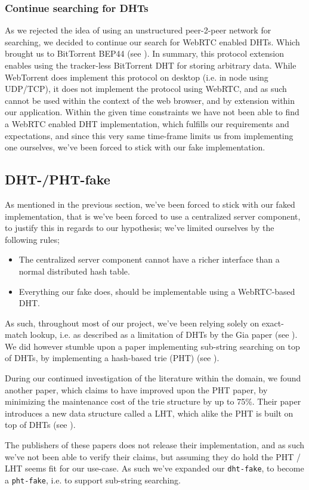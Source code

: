 \subsubsection{Continue searching for \acs{DHT}s}
As we rejected the idea of using an unstructured peer-2-peer network for
searching, we decided to continue our search for WebRTC enabled \acs{DHT}s. Which
brought us to BitTorrent \acs{BEP}44 (see \citep{bittorrent:bep44}). In summary, this
protocol extension enables using the tracker-less BitTorrent \acs{DHT} for storing
arbitrary data. While WebTorrent does implement this protocol on desktop (i.e.
in node using \acs{UDP}/\acs{TCP}), it does not implement the protocol using WebRTC, and as
such cannot be used within the context of the web browser, and by extension
within our application.
\newline\newline
Within the given time constraints we have not been able to find a WebRTC enabled
\acs{DHT} implementation, which fulfills our requirements and expectations, and since
this very same time-frame limits us from implementing one ourselves, we've been
forced to stick with our fake implementation.

\subsection{\acs{DHT}-/\acs{PHT}-fake}
As mentioned in the previous section, we've been forced to stick with our faked
implementation, that is we've been forced to use a centralized server component,
to justify this in regards to our hypothesis; we've limited ourselves by the 
following rules;
\begin{itemize}
\item The centralized server component cannot have a richer interface than a 
    normal distributed hash table.
\item Everything our fake does, should be implementable using a WebRTC-based \acs{DHT}.
\end{itemize}
As such, throughout most of our project, we've been relying solely on
exact-match lookup, i.e. as described as a limitation of \acs{DHT}s by the Gia paper
(see \citep{Chawathe:Gia}). We did however stumble upon a paper implementing 
sub-string searching on top of \acs{DHT}s, by implementing a hash-based trie (\acs{PHT})
(see \citep{Ramabhadran:PHT}).

During our continued investigation of the literature within the domain, we 
found another paper, which claims to have improved upon the \acs{PHT} paper, by 
minimizing the maintenance cost of the trie structure by up to 75\%. Their
paper introduces a new data structure called a \ac{LHT},
which alike the \acs{PHT} is built on top of \acs{DHT}s (see \citep{Tang:LHT}).

The publishers of these papers does not release their implementation, and as
such we've not been able to verify their claims, but assuming they do hold the
\acs{PHT} / \acs{LHT} seems fit for our use-case. As such we've expanded our \verb|dht-fake|,
to become a \verb|pht-fake|, i.e. to support sub-string searching.
